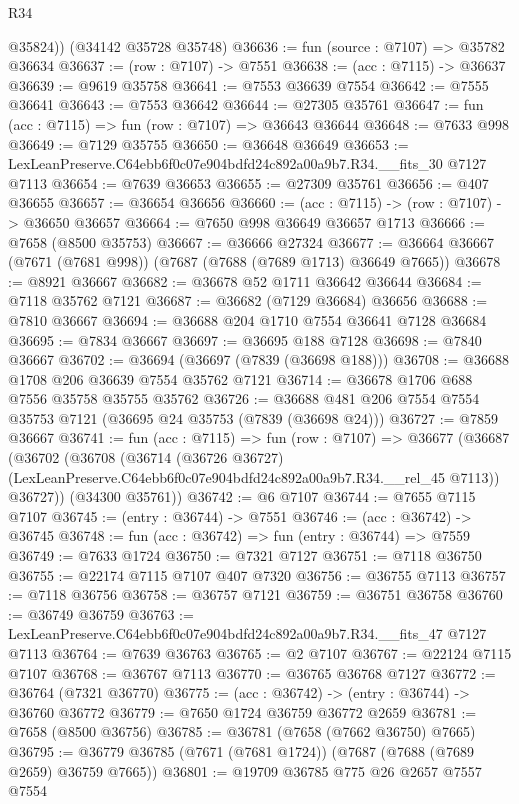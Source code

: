 \begin{lexlean}{R34}
\begin{coremodule}
        @35824))
    (@34142 @35728 @35748)
@36636 := fun (source : @7107) => @35782 @36634
@36637 := (row : @7107) -> @7551
@36638 := (acc : @7115) -> @36637
@36639 := @9619 @35758
@36641 := @7553 @36639 @7554
@36642 := @7555 @36641
@36643 := @7553 @36642
@36644 := @27305 @35761
@36647 := fun (acc : @7115) => fun (row : @7107) => @36643 @36644
@36648 := @7633 @998
@36649 := @7129 @35755
@36650 := @36648 @36649
@36653 := LexLeanPreserve.C64ebb6f0c07e904bdfd24c892a00a9b7.R34.__fits_30 @7127 @7113
@36654 := @7639 @36653
@36655 := @27309 @35761
@36656 := @407 @36655
@36657 := @36654 @36656
@36660 := (acc : @7115) -> (row : @7107) -> @36650 @36657
@36664 := @7650 @998 @36649 @36657 @1713
@36666 := @7658 (@8500 @35753)
@36667 := @36666 @27324
@36677 := @36664 @36667 (@7671 (@7681 @998)) (@7687 (@7688 (@7689 @1713) @36649 @7665))
@36678 := @8921 @36667
@36682 := @36678 @52 @1711 @36642 @36644
@36684 := @7118 @35762 @7121
@36687 := @36682 (@7129 @36684) @36656
@36688 := @7810 @36667
@36694 := @36688 @204 @1710 @7554 @36641 @7128 @36684
@36695 := @7834 @36667
@36697 := @36695 @188 @7128
@36698 := @7840 @36667
@36702 := @36694 (@36697 (@7839 (@36698 @188)))
@36708 := @36688 @1708 @206 @36639 @7554 @35762 @7121
@36714 := @36678 @1706 @688 @7556 @35758 @35755 @35762
@36726 := @36688 @481 @206 @7554 @7554 @35753 @7121 (@36695 @24 @35753 (@7839 (@36698 @24)))
@36727 := @7859 @36667
@36741 := fun (acc : @7115) =>
  fun (row : @7107) =>
  @36677
    (@36687
      (@36702
        (@36708
          (@36714
            (@36726 @36727)
            (LexLeanPreserve.C64ebb6f0c07e904bdfd24c892a00a9b7.R34.__rel_45 @7113))
          @36727))
      (@34300 @35761))
@36742 := @6 @7107
@36744 := @7655 @7115 @7107
@36745 := (entry : @36744) -> @7551
@36746 := (acc : @36742) -> @36745
@36748 := fun (acc : @36742) => fun (entry : @36744) => @7559
@36749 := @7633 @1724
@36750 := @7321 @7127
@36751 := @7118 @36750
@36755 := @22174 @7115 @7107 @407 @7320
@36756 := @36755 @7113
@36757 := @7118 @36756
@36758 := @36757 @7121
@36759 := @36751 @36758
@36760 := @36749 @36759
@36763 := LexLeanPreserve.C64ebb6f0c07e904bdfd24c892a00a9b7.R34.__fits_47 @7127 @7113
@36764 := @7639 @36763
@36765 := @2 @7107
@36767 := @22124 @7115 @7107
@36768 := @36767 @7113
@36770 := @36765 @36768 @7127
@36772 := @36764 (@7321 @36770)
@36775 := (acc : @36742) -> (entry : @36744) -> @36760 @36772
@36779 := @7650 @1724 @36759 @36772 @2659
@36781 := @7658 (@8500 @36756)
@36785 := @36781 (@7658 (@7662 @36750) @7665)
@36795 := @36779 @36785 (@7671 (@7681 @1724)) (@7687 (@7688 (@7689 @2659) @36759 @7665))
@36801 := @19709 @36785 @775 @26 @2657 @7557 @7554

\end{coremodule}
\end{lexlean}
